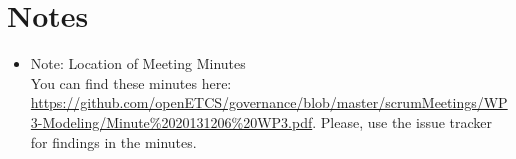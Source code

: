 \documentclass[a4paper, 11pt]{article}
\begin{document}
\section{Notes}
\begin{itemize}

\item Note: Location of Meeting Minutes\\
You can find these minutes here: \url{https://github.com/openETCS/governance/blob/master/scrumMeetings/WP3-Modeling/Minute%2020131206%20WP3.pdf}. Please, use the issue tracker for findings in the minutes.
\end{itemize}
\end{document}
